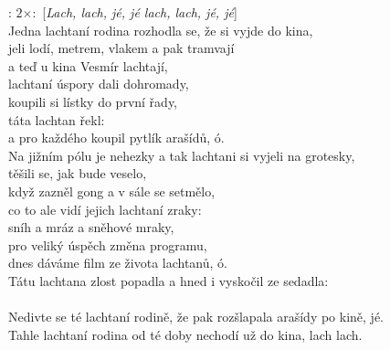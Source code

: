 
\textregistered: $2\times:$ [\emph{Lach, lach, jé, jé lach, lach, jé, jé}]\\

Jedna lachtaní rodina rozhodla se, že si vyjde do kina,\\
jeli lodí, metrem, vlakem a pak tramvají\\
a teď u kina Vesmír lachtají,\\
lachtaní úspory dali dohromady,\\
koupili si lístky do první řady,\\
táta lachtan řekl: \\
a pro každého koupil pytlík arašídů, ó. \hspace{1cm} \textregistered\\

Na jižním pólu je nehezky a tak lachtani si vyjeli na grotesky,\\
těšili se, jak bude veselo,\\
když zazněl gong a v sále se setmělo,\\
co to ale vidí jejich lachtaní zraky:\\
sníh a mráz a sněhové mraky,\\
pro veliký úspěch změna programu,\\
dnes dáváme film ze života lachtanů, ó. \hspace{1cm} \textregistered\\

Tátu lachtana zlost popadla a hned i vyskočil ze sedadla:\\
\\
Nedivte se té lachtaní rodině, že pak rozšlapala arašídy po kině, jé. \textregistered\\

Tahle lachtaní rodina od té doby nechodí už do kina, lach lach. 

\newpage

